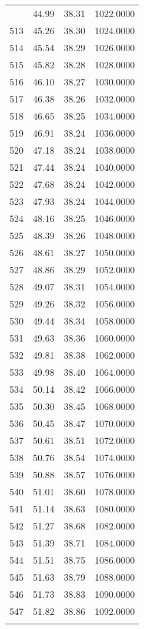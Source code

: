 \documentclass[
  captions=tableheading,
]{scrartcl}
\begin{document}
\begin{longtable} {l|l|l|l}
{512	& 44.99 &	38.31 &	1022.0000\\
513	& 45.26 &	38.30 &	1024.0000\\
514	& 45.54 &	38.29 &	1026.0000\\
515	& 45.82 &	38.28 &	1028.0000\\
516	& 46.10 &	38.27 &	1030.0000\\
517	& 46.38 &	38.26 &	1032.0000\\
518	& 46.65 &	38.25 &	1034.0000\\
519	& 46.91 &	38.24 &	1036.0000\\
520	& 47.18 &	38.24 &	1038.0000\\
521	& 47.44 &	38.24 &	1040.0000\\
522	& 47.68 &	38.24 &	1042.0000\\
523	& 47.93 &	38.24 &	1044.0000\\
524	& 48.16 &	38.25 &	1046.0000\\
525	& 48.39 &	38.26 &	1048.0000\\
526	& 48.61 &	38.27 &	1050.0000\\
527	& 48.86 &	38.29 &	1052.0000\\
528	& 49.07 &	38.31 &	1054.0000\\
529	& 49.26 &	38.32 &	1056.0000\\
530	& 49.44 &	38.34 &	1058.0000\\
531	& 49.63 &	38.36 &	1060.0000\\
532	& 49.81 &	38.38 &	1062.0000\\
533	& 49.98 &	38.40 &	1064.0000\\
534	& 50.14 &	38.42 &	1066.0000\\
535	& 50.30 &	38.45 &	1068.0000\\
536	& 50.45 &	38.47 &	1070.0000\\
537	& 50.61 &	38.51 &	1072.0000\\
538	& 50.76 &	38.54 &	1074.0000\\
539	& 50.88 &	38.57 &	1076.0000\\
540	& 51.01 &	38.60 &	1078.0000\\
541	& 51.14 &	38.63 &	1080.0000\\
542	& 51.27 &	38.68 &	1082.0000\\
543	& 51.39 &	38.71 &	1084.0000\\
544	& 51.51 &	38.75 &	1086.0000\\
545	& 51.63 &	38.79 &	1088.0000\\
546	& 51.73 &	38.83 &	1090.0000\\
547	& 51.82 &	38.86 &	1092.0000\\
}
\end{longtable}
\end{document}
